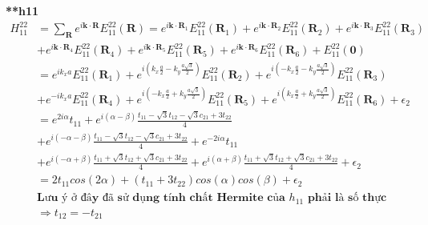 \documentclass{article}
\begin{document}
\textbf{**h11}
\begin{align*}
    H^{22}_{11} & = \sum_{\mathbf{R}} e^{i \mathbf{k} \cdot \mathbf{R}} E^{22}_{11}(\mathbf{R})
    = e^{i \mathbf{k} \cdot \mathbf{R}_1} E^{22}_{11}(\mathbf{R}_1)
    + e^{i \mathbf{k} \cdot \mathbf{R}_2} E^{22}_{11}(\mathbf{R}_2)
    + e^{i \mathbf{k} \cdot \mathbf{R}_3} E^{22}_{11}(\mathbf{R}_3)                                                                                                                                                                 \\
                & + e^{i \mathbf{k} \cdot \mathbf{R}_4} E^{22}_{11}(\mathbf{R}_4)
    + e^{i \mathbf{k} \cdot \mathbf{R}_5} E^{22}_{11}(\mathbf{R}_5)
    + e^{i \mathbf{k} \cdot \mathbf{R}_6} E^{22}_{11}(\mathbf{R}_6)
    + E^{22}_{11}(\mathbf{0})                                                                                                                                                                                                       \\
                & = e^{i k_x a} E^{22}_{11}(\mathbf{R}_1)
    + e^{i \left( k_x \frac{a}{2} - k_y \frac{a\sqrt{3}}{2} \right)} E^{22}_{11}(\mathbf{R}_2)
    + e^{i \left( -k_x \frac{a}{2} - k_y \frac{a\sqrt{3}}{2} \right)} E^{22}_{11}(\mathbf{R}_3)                                                                                                                                     \\
                & + e^{-i k_x a } E^{22}_{11}(\mathbf{R}_4)
    + e^{i \left( -k_x \frac{a}{2} + k_y \frac{a\sqrt{3}}{2} \right)} E^{22}_{11}(\mathbf{R}_5)
    + e^{i \left( k_x \frac{a}{2} + k_y \frac{a\sqrt{3}}{2} \right)} E^{22}_{11}(\mathbf{R}_6) + \epsilon_2                                                                                                                         \\
                & = e^{2i\alpha} t_{11} + e^{i \left( \alpha - \beta \right)} \frac{t_{11} -\sqrt{3}t_{12} - \sqrt{3}c_{21} + 3t_{22}}{4}                                                                                           \\
                & + e^{i \left( -\alpha - \beta \right)} \frac{t_{11} -\sqrt{3}t_{12} - \sqrt{3}c_{21} + 3t_{22}}{4} + e^{-2i\alpha} t_{11}                                                                                         \\
                & + e^{i \left( -\alpha + \beta \right)} \frac{t_{11} +\sqrt{3}t_{12} + \sqrt{3}c_{21} + 3t_{22}}{4} + e^{i \left( \alpha + \beta \right)} \frac{t_{11} +\sqrt{3}t_{12} + \sqrt{3}c_{21} + 3t_{22}}{4} + \epsilon_2 \\
                & = 2t_{11}cos(2\alpha) + \left (t_{11} + 3t_{22}\right )cos(\alpha)cos(\beta) + \epsilon_2                                                                                                                         \\
                & \textbf{Lưu ý ở đây đã sử dụng tính chất Hermite của $h_{11}$ phải là số thực}                                                                                                                                    \\ &\Rightarrow t_{12} = - t_{21}
\end{align*}
\end{document}

